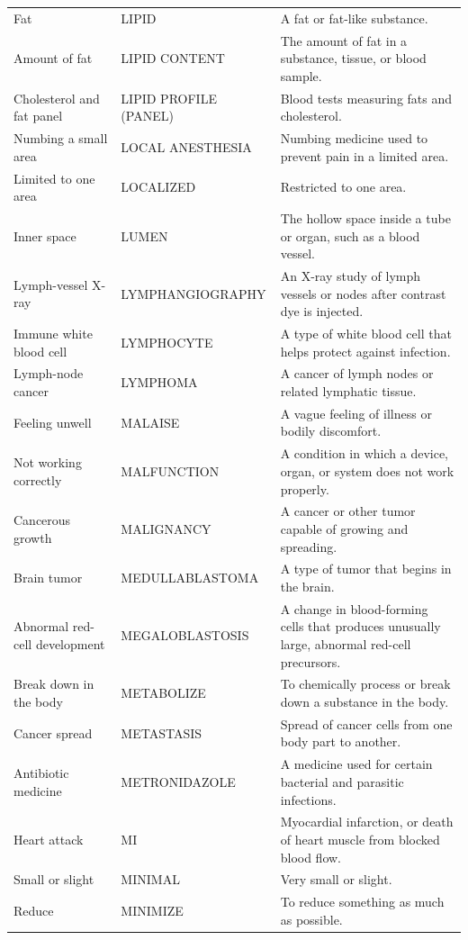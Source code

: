 \begin{longtable}{>{\raggedright\arraybackslash}p{} >{\raggedright\arraybackslash}p{} >{\raggedright\arraybackslash}p{}}
Fat & LIPID & A fat or fat-like substance. \\
Amount of fat & LIPID CONTENT & The amount of fat in a substance, tissue, or blood sample. \\
Cholesterol and fat panel & LIPID PROFILE (PANEL) & Blood tests measuring fats and cholesterol. \\
Numbing a small area & LOCAL ANESTHESIA & Numbing medicine used to prevent pain in a limited area. \\
Limited to one area & LOCALIZED & Restricted to one area. \\
Inner space & LUMEN & The hollow space inside a tube or organ, such as a blood vessel. \\
Lymph-vessel X-ray & LYMPHANGIOGRAPHY & An X-ray study of lymph vessels or nodes after contrast dye is injected. \\
Immune white blood cell & LYMPHOCYTE & A type of white blood cell that helps protect against infection. \\
Lymph-node cancer & LYMPHOMA & A cancer of lymph nodes or related lymphatic tissue. \\
Feeling unwell & MALAISE & A vague feeling of illness or bodily discomfort. \\
Not working correctly & MALFUNCTION & A condition in which a device, organ, or system does not work properly. \\
Cancerous growth & MALIGNANCY & A cancer or other tumor capable of growing and spreading. \\
Brain tumor & MEDULLABLASTOMA & A type of tumor that begins in the brain. \\
Abnormal red-cell development & MEGALOBLASTOSIS & A change in blood-forming cells that produces unusually large, abnormal red-cell precursors. \\
Break down in the body & METABOLIZE & To chemically process or break down a substance in the body. \\
Cancer spread & METASTASIS & Spread of cancer cells from one body part to another. \\
Antibiotic medicine & METRONIDAZOLE & A medicine used for certain bacterial and parasitic infections. \\
Heart attack & MI & Myocardial infarction, or death of heart muscle from blocked blood flow. \\
Small or slight & MINIMAL & Very small or slight. \\
Reduce & MINIMIZE & To reduce something as much as possible. \\

\end{longtable}
